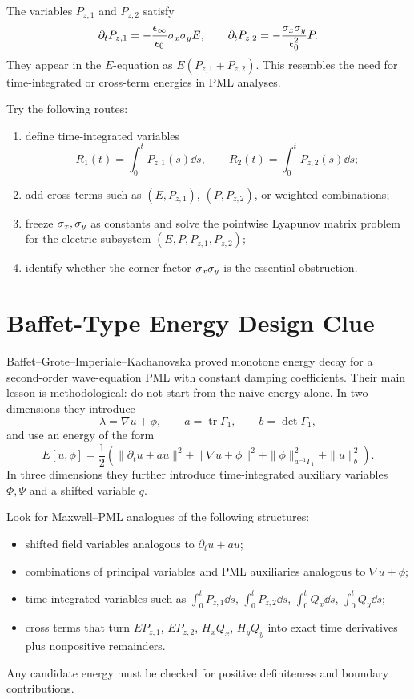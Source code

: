 \documentclass[UTF8,a4paper,12pt]{ctexart}
\begin{document}
The variables \(P_{z,1}\) and \(P_{z,2}\) satisfy
\[
  \partial_tP_{z,1}=-\frac{\epsilon_\infty}{\epsilon_0}\sigma_x\sigma_y E,\qquad
  \partial_tP_{z,2}=-\frac{\sigma_x\sigma_y}{\epsilon_0^2}P.
\]
They appear in the \(E\)-equation as \(E(P_{z,1}+P_{z,2})\).  This resembles the need for time-integrated or cross-term energies in PML analyses.

\begin{task}
Try the following routes:
\begin{enumerate}
\item define time-integrated variables
\[
  R_1(t)=\int_0^tP_{z,1}(s)\dd s,\qquad
  R_2(t)=\int_0^tP_{z,2}(s)\dd s;
\]
\item add cross terms such as \((E,P_{z,1})\), \((P,P_{z,2})\), or weighted combinations;
\item freeze \(\sigma_x,\sigma_y\) as constants and solve the pointwise Lyapunov matrix problem for the electric subsystem \((E,P,P_{z,1},P_{z,2})\);
\item identify whether the corner factor \(\sigma_x\sigma_y\) is the essential obstruction.
\end{enumerate}
\end{task}

\section{Baffet-Type Energy Design Clue}

Baffet--Grote--Imperiale--Kachanovska proved monotone energy decay for a second-order wave-equation PML with constant damping coefficients\cite{baffetGroteImperialeKachanovska2019}.  Their main lesson is methodological: do not start from the naive energy alone.  In two dimensions they introduce
\[
  \lambda=\nabla u+\phi,\qquad
  a=\operatorname{tr}\Gamma_1,\qquad
  b=\det\Gamma_1,
\]
and use an energy of the form
\[
  E[u,\phi]=\frac12\left(
  \|\partial_tu+a u\|^2+\|\nabla u+\phi\|^2
  +\|\phi\|^2_{a^{-1}\Gamma_1}+\|u\|^2_b\right).
\]
In three dimensions they further introduce time-integrated auxiliary variables \(\Phi,\Psi\) and a shifted variable \(q\).

\begin{task}
Look for Maxwell--PML analogues of the following structures:
\begin{itemize}
\item shifted field variables analogous to \(\partial_tu+a u\);
\item combinations of principal variables and PML auxiliaries analogous to \(\nabla u+\phi\);
\item time-integrated variables such as \(\int_0^tP_{z,1}\dd s\), \(\int_0^tP_{z,2}\dd s\), \(\int_0^tQ_x\dd s\), \(\int_0^tQ_y\dd s\);
\item cross terms that turn \(E P_{z,1}\), \(E P_{z,2}\), \(H_xQ_x\), \(H_yQ_y\) into exact time derivatives plus nonpositive remainders.
\end{itemize}
Any candidate energy must be checked for positive definiteness and boundary contributions.
\end{task}
\end{document}
